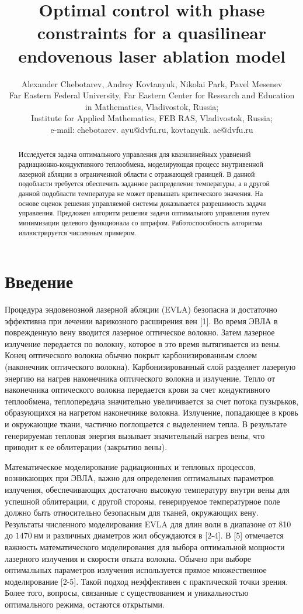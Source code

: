 \documentclass[10pt]{article}
\title{Optimal control with phase constraints for a quasilinear endovenous laser ablation model }
\author{Alexander Chebotarev, Andrey Kovtanyuk, Nikolai Park, Pavel Mesenev\\
Far Eastern Federal University, Far Eastern Center for Research and Education\\
in Mathematics, Vladivostok, Russia;\\
Institute for Applied Mathematics, FEB RAS, Vladivostok, Russia;\\
e-mail: chebotarev. ayu@dvfu.ru, kovtanyuk. ae@dvfu.ru}
\date{}
\begin{document}
\maketitle


\begin{abstract}
Исследуется задача оптимального управления для квазилинейных уравнений
радиационно-кондуктивного
теплообмена, моделирующая процесс внутривенной лазерной
абляции в ограниченной области с отражающей границей.
В данной подобласти требуется обеспечить заданное
распределение температуры, а в другой
данной подобласти температура не может превышать критического значения.
На основе оценок решения управляемой системы
доказывается разрешимость задачи управления.
Предложен алгоритм
решения задачи оптимального управления путем минимизации целевого функционала со штрафом.
Работоспособность алгоритма иллюстрируется численным примером.
\end{abstract}

\section{Введение}
Процедура эндовенозной лазерной абляции (EVLA) безопасна и достаточно
эффективна при лечении варикозного расширения вен [1].
Во время ЭВЛА в поврежденную вену вводится лазерное оптическое волокно.
Затем лазерное излучение передается по волокну, которое в это время вытягивается из вены.
Конец оптического волокна обычно покрыт карбонизированным слоем (наконечник оптического волокна).
Карбонизированный слой разделяет лазерную энергию на нагрев наконечника оптического волокна и излучение.
Тепло от наконечника оптического волокна передается крови за счет кондуктивного теплообмена,
теплопередача значительно увеличивается за счет потока пузырьков,
образующихся на нагретом наконечнике волокна.
Излучение, попадающее в кровь и окружающие ткани, частично поглощается с выделением тепла.
В результате генерируемая тепловая энергия вызывает значительный нагрев вены,
что приводит к ее облитерации (закрытию вены).



Математическое моделирование радиационных и тепловых процессов, возникающих при ЭВЛА,
важно для определения оптимальных параметров излучения, обеспечивающих достаточно
высокую температуру внутри вены для успешной облитерации, с другой стороны,
генерируемое температурное поле должно быть относительно безопасным для тканей, окружающих вену.
Результаты численного моделирования EVLA для длин волн в диапазоне от
810 до $1470 \mathrm{~нм}$ и различных диаметров жил обсуждаются в [2-4].
В [5] отмечается важность математического моделирования для выбора оптимальной
мощности лазерного излучения и скорости отката волокна.
Обычно при выборе оптимальных параметров излучения
используется прямое множественное моделирование [2-5].
Такой подход неэффективен с практической точки зрения.
Более того, вопросы, связанные с существованием и
уникальностью оптимального режима, остаются открытыми.
\end{document}
